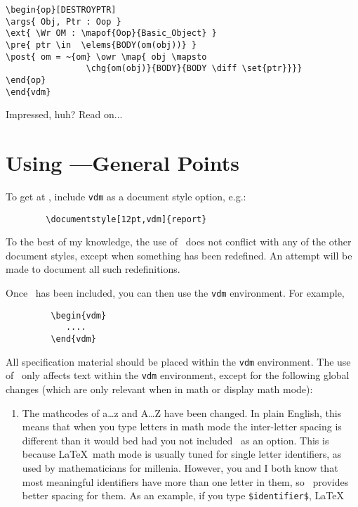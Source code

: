 {\begin{verbatim}
\begin{op}[DESTROYPTR]
\args{ Obj, Ptr : Oop }
\ext{ \Wr OM : \mapof{Oop}{Basic_Object} }
\pre{ ptr \in  \elems{BODY(om(obj))} }
\post{ om = ~{om} \owr \map{ obj \mapsto 
                \chg{om(obj)}{BODY}{BODY \diff \set{ptr}}}}
\end{op}
\end{vdm}

\end{verbatim}

\noindent
Impressed, huh?  Read on...


\section*{Using \Vdm---General Points}

To get at \Vdm, include {\tt vdm\/} as a document style option, e.g.:
\begin{verbatim}
        \documentstyle[12pt,vdm]{report}
\end{verbatim}
\begin{dangerous}
To the best of my knowledge, the use of \Vdm\ does not conflict with
any of the other document styles, except when something has been
redefined.   An attempt will be made to document all such redefinitions.
\end{dangerous}
Once \Vdm\ has been included, you can then use the {\tt vdm\/}
environment.  For example,
\begin{verbatim}
         \begin{vdm}
            ....
         \end{vdm}
\end{verbatim}
All specification material should be placed within the {\tt vdm\/}
environment.  The use of \Vdm\ only affects text within the {\tt vdm\/}
environment, except for the following global changes (which are only
relevant when in math or display math mode):
\begin{enumerate}
\item	The mathcodes of a\dots z and A\dots Z have been changed.  In
	plain English, this means that when you type letters in math
	mode the inter-letter spacing is different than it would bed
	had you not included \Vdm\ as an option.  This is because
	\LaTeX\ math mode is usually tuned for single letter
	identifiers, as used by mathematicians for millenia.  However,
	you and I both know that most meaningful identifiers have more
	than one letter in them, so \Vdm\ provides better spacing for
	them.  As an example, if you type \verb;$identifier$;, \LaTeX\

\end{enumerate}}
